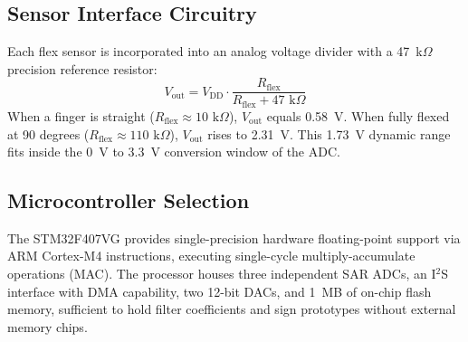 \documentclass[conference]{IEEEtran}
\begin{document}
\begin{table}[t]
\caption{System Hardware Components and Specifications}
\label{tab:hardware}
\centering
{}
\end{table}

\subsection{Sensor Interface Circuitry}
Each flex sensor is incorporated into an analog voltage divider with a 47~k$\Omega$ precision reference resistor:
\begin{equation}
V_{\text{out}} = V_{\text{DD}} \cdot \frac{R_{\text{flex}}}{R_{\text{flex}} + 47\text{ k}\Omega}
\label{eq:vdiv}
\end{equation}
When a finger is straight ($R_{\text{flex}} \approx 10\text{ k}\Omega$), $V_{\text{out}}$ equals 0.58~V. When fully flexed at 90 degrees ($R_{\text{flex}} \approx 110\text{ k}\Omega$), $V_{\text{out}}$ rises to 2.31~V. This 1.73~V dynamic range fits inside the 0~V to 3.3~V conversion window of the ADC.

\subsection{Microcontroller Selection}
The STM32F407VG provides single-precision hardware floating-point support via ARM Cortex-M4 instructions, executing single-cycle multiply-accumulate operations (MAC). The processor houses three independent SAR ADCs, an I$^2$S interface with DMA capability, two 12-bit DACs, and 1~MB of on-chip flash memory, sufficient to hold filter coefficients and sign prototypes without external memory chips.
\end{document}
